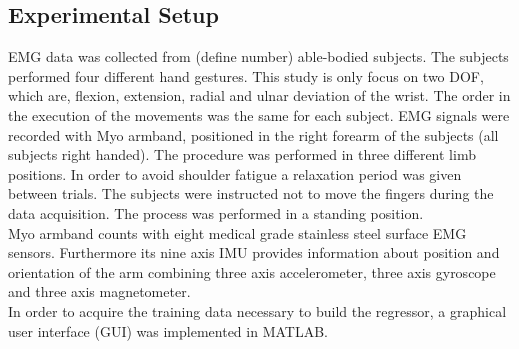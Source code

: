 \subsection{Experimental Setup}
EMG data was collected from (define number) able-bodied subjects. The subjects performed four different hand gestures. This study is only focus on two DOF, which are, flexion, extension, radial and ulnar deviation of the wrist. The order in the execution of the movements was the same for each subject. EMG signals were recorded with Myo armband, positioned in the right forearm of the subjects (all subjects right handed). The procedure was performed in three different limb positions. In order to avoid shoulder fatigue a relaxation period was given between trials. The subjects were instructed not to move the fingers during the data acquisition. The process was performed in a standing position. \\ %
 Myo armband counts with eight medical grade stainless steel surface EMG sensors. %
 Furthermore its nine axis IMU provides information about position and orientation of the arm combining three axis accelerometer, three axis gyroscope and three axis magnetometer.\\   
 In order to acquire the training data necessary to build the regressor, a graphical user interface (GUI) was implemented in MATLAB. %

	
